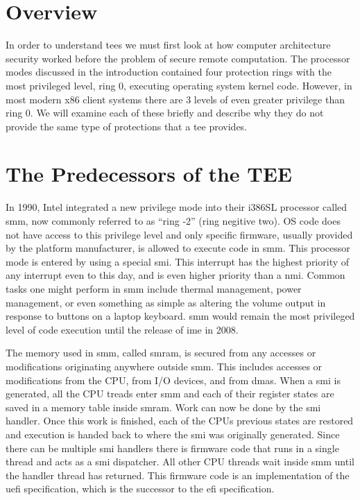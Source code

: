 \section{Overview}
In order to understand \glspl{tee} we must first look at how computer architecture security worked before the problem of secure remote computation. The processor modes discussed in the introduction contained four protection rings with the most privileged level, ring 0, executing operating system kernel code. However, in most modern x86 client systems there are 3 levels of even greater privilege than ring 0. We will examine each of these briefly and describe why they do not provide the same type of protections that a \gls{tee} provides.

\section{The Predecessors of the TEE}

In 1990, Intel integrated a new privilege mode into their i386SL processor called \gls{smm}, \cite{zimmer2005hardened} now commonly referred to as ``ring -2'' (ring negitive two).  OS code does not have access to this privilege level and only specific firmware, usually provided by the platform manufacturer, is allowed to execute code in \gls{smm}. This processor mode is entered by using a special \gls{smi}. This interrupt has the highest priority of any interrupt even to this day, and is even higher priority than a \gls{nmi}. Common tasks one might perform in \gls{smm} include thermal management, power management, or even something as simple as altering the volume output in response to buttons on a laptop keyboard. \cite{yao2009system} \gls{smm} would remain the most privileged level of code execution until the release of \gls{ime} in 2008. \cite{eldar2008configuring}

The memory used in \gls{smm}, called \gls{smram}, is secured from any accesses or modifications originating anywhere outside \gls{smm}. This includes accesses or modifications from the CPU, from I/O devices, and from \glspl{dma}. When a \gls{smi} is generated, all the CPU treads enter \gls{smm} and each of their register states are saved in a memory table inside \gls{smram}. Work can now be done by the \gls{smi} handler. Once this work is finished, each of the CPUs previous states are restored and execution is handed back to where the \gls{smi} was originally generated. Since there can be multiple \gls{smi} handlers there is firmware code that runs in a single thread and acts as a \gls{smi} dispatcher. All other CPU threads wait inside \gls{smm} until the handler thread has returned. \cite{delgado2013} This firmware code is an implementation of the \gls{uefi} specification, which is the successor to the \gls{efi} specification. \cite{beyondBIOS}

